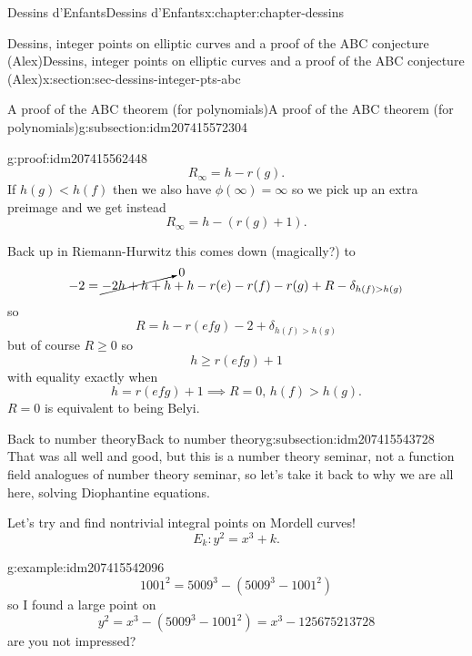 \documentclass[oneside,10pt,]{book}
\numberwithin{equation}{section}
\newcommand{\lt}{<}
\newcommand{\gt}{>}
\begin{document}
\begin{chapterptx}{Dessins d'Enfants}{}{Dessins d'Enfants}{}{}{x:chapter:chapter-dessins}
\begin{sectionptx}{Dessins, integer points on elliptic curves and a proof of the ABC conjecture (Alex)}{}{Dessins, integer points on elliptic curves and a proof of the ABC conjecture (Alex)}{}{}{x:section:sec-dessins-integer-pts-abc}
\begin{subsectionptx}{A proof of the ABC theorem (for polynomials)}{}{A proof of the ABC theorem (for polynomials)}{}{}{g:subsection:idm207415572304}
\begin{proofptx}{}{g:proof:idm207415562448}
\begin{equation*}
R_\infty = h - r(g)\text{.}
\end{equation*}
If \(h(g) \lt h(f)\) then we also have \(\phi(\infty) = \infty\) so we pick up an extra preimage and we get instead%
\begin{equation*}
R_\infty = h - (r(g) + 1)\text{.}
\end{equation*}
%
\par
Back up in Riemann-Hurwitz this comes down (magically?) to%
\begin{equation*}
-2 = \cancelto{0}{-2 h + h + h} + h - r(e) -r(f) - r(g) + R - \delta_{h(f) \gt h(g)}
\end{equation*}
so%
\begin{equation*}
R = h - r(efg) - 2 + \delta_{h(f) \gt h(g)}
\end{equation*}
but of course \(R \ge 0\) so%
\begin{equation*}
h \ge r(efg) + 1
\end{equation*}
with equality exactly when%
\begin{equation*}
h = r(efg) + 1 \implies R = 0,\, h(f) \gt h(g)\text{.}
\end{equation*}
\(R= 0\) is equivalent to being Belyi.%
\end{proofptx}
\end{subsectionptx}
%
%
\typeout{************************************************}
\typeout{************************************************}
%
\begin{subsectionptx}{Back to number theory}{}{Back to number theory}{}{}{g:subsection:idm207415543728}
That was all well and good, but this is a number theory seminar, not a function field analogues of number theory seminar, so let's take it back to why we are all here, solving Diophantine equations.%
\par
Let's try and find nontrivial integral points on Mordell curves!%
\begin{equation*}
E_k\colon y^2 = x^3 + k\text{.}
\end{equation*}
%
\begin{example}{}{g:example:idm207415542096}%
%
\begin{equation*}
1001^2 = 5009^3 - (5009^3 - 1001^2)
\end{equation*}
so I found a large point on%
\begin{equation*}
y^2 = x^3 - (5009^3 - 1001^2) = x^3 - 125675213728
\end{equation*}
are you not impressed?%
\end{example}

\end{subsectionptx}
\end{sectionptx}
\end{chapterptx}
\end{document}
